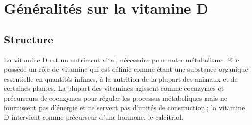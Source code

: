 \documentclass[
  a4paper,
  DIV=11,
  numbers=noendperiod,
  listof=totoc]{scrreprt}
\begin{document}
\newpage{}

\hypertarget{guxe9nuxe9ralituxe9s-sur-la-vitamine-d}{%
\chapter{Généralités sur la vitamine
D}\label{guxe9nuxe9ralituxe9s-sur-la-vitamine-d}}

\hypertarget{structure}{%
\section{Structure}\label{structure}}

La vitamine D est un nutriment vital, nécessaire pour notre métabolisme.
Elle possède un rôle de vitamine qui est définie comme étant une
substance organique essentielle en quantités infimes, à la nutrition de
la plupart des animaux et de certaines plantes. La plupart des vitamines
agissent comme coenzymes et précurseurs de coenzymes pour réguler les
processus métaboliques mais ne fournissent pas d'énergie et ne servent
pas d'unités de construction \autocite{Ellison.2021} ; la vitamine D
intervient comme précurseur d'une hormone, le calcitriol.
\end{document}
